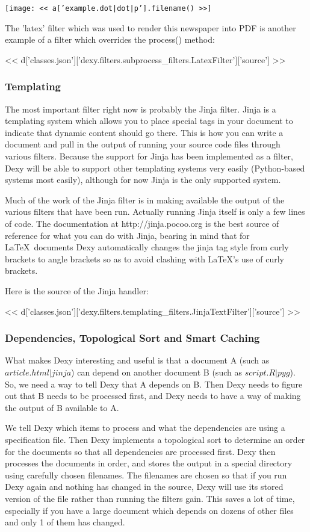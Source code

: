 \documentclass[custom, plainsections]{sciposter}
\begin{document}
\begin{multicols*}{2}
\texttt{[image: << a['example.dot|dot|p'].filename() >>]}

The 'latex' filter which was used to render this newspaper into PDF is another example of a filter which overrides the process() method:

\tiny
<< d['classes.json']['dexy.filters.subprocess_filters.LatexFilter']['source'] >>
\small

\subsubsection*{Templating}

The most important filter right now is probably the Jinja filter. Jinja is a templating system which allows you to place special tags in your document to indicate that dynamic content should go there. This is how you can write a document and pull in the output of running your source code files through various filters. Because the support for Jinja has been implemented as a filter, Dexy will be able to support other templating systems very easily (Python-based systems most easily), although for now Jinja is the only supported system.

Much of the work of the Jinja filter is in making available the output of the various filters that have been run. Actually running Jinja itself is only a few lines of code. The documentation at http://jinja.pocoo.org is the best source of reference for what you can do with Jinja, bearing in mind that for \LaTeX~documents Dexy automatically changes the jinja tag style from curly brackets to angle brackets so as to avoid clashing with \LaTeX's use of curly brackets.

Here is the source of the Jinja handler:

\tiny
<< d['classes.json']['dexy.filters.templating_filters.JinjaTextFilter']['source'] >>
\small

\subsubsection*{Dependencies, Topological Sort and Smart Caching}

What makes Dexy interesting and useful is that a document A (such as $article.html|jinja$) can depend on another document B (such as $script.R|pyg$). So, we need a way to tell Dexy that A depends on B. Then Dexy needs to figure out that B needs to be processed first, and Dexy needs to have a way of making the output of B available to A.

We tell Dexy which items to process and what the dependencies are using a specification file. Then Dexy implements a topological sort to determine an order for the documents so that all dependencies are processed first. Dexy then processes the documents in order, and stores the output in a special directory using carefully chosen filenames. The filenames are chosen so that if you run Dexy again and nothing has changed in the source, Dexy will use its stored version of the file rather than running the filters gain. This saves a lot of time, especially if you have a large document which depends on dozens of other files and only 1 of them has changed.


\end{multicols*}
\end{document}
